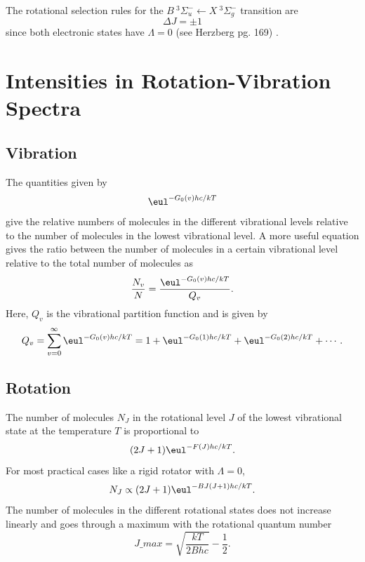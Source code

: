 \documentclass[11pt, twoside, fleqn]{report}
\begin{document}
The rotational selection rules for the $B~^3\Sigma_u^-\!\leftarrow\!X~^3\Sigma_g^-$ transition are
\begin{equation}
    \Delta{}J = \pm 1
\end{equation}
since both electronic states have $\Lambda = 0$ (see Herzberg pg. 169) \cite{herzberg:spectra}.

\chapter{Intensities in Rotation-Vibration Spectra}
\label{c:intensities_in_rotation-vibration_spectra}

\section{Vibration}
\label{s:vibration}

The quantities given by
\begin{equation*}
    \eul^{-G_0(v)hc/kT}
\end{equation*}
give the relative numbers of molecules in the different vibrational levels relative to the number of molecules in the lowest vibrational level. A more useful equation gives the ratio between the number of molecules in a certain vibrational level relative to the total number of molecules as
\begin{equation*}
    \frac{N_v}{N} = \frac{\eul^{-G_0(v)hc/kT}}{Q_v}.
\end{equation*}
Here, $Q_v$ is the vibrational partition function and is given by
\begin{equation*}
    Q_v = \sum_{v=0}^{\infty}\eul^{-G_0(v)hc/kT} = 1 + \eul^{-G_0(1)hc/kT} + \eul^{-G_0(2)hc/kT} + \dotsb.
\end{equation*}

\section{Rotation}
\label{s:rotation}

The number of molecules $N_J$ in the rotational level $J$ of the lowest vibrational state at the temperature $T$ is proportional to
\begin{equation*}
    (2J + 1)\eul^{-F(J)hc/kT}.
\end{equation*}
For most practical cases like a rigid rotator with $\Lambda = 0$,
\begin{equation*}
    N_J \propto (2J + 1)\eul^{-BJ(J + 1)hc/kT}.
\end{equation*}
The number of molecules in the different rotational states does not increase linearly and goes through a maximum with the rotational quantum number
\begin{equation*}
    J\_{max} = \sqrt{\frac{kT}{2Bhc}} - \frac{1}{2}.
\end{equation*}
\end{document}
